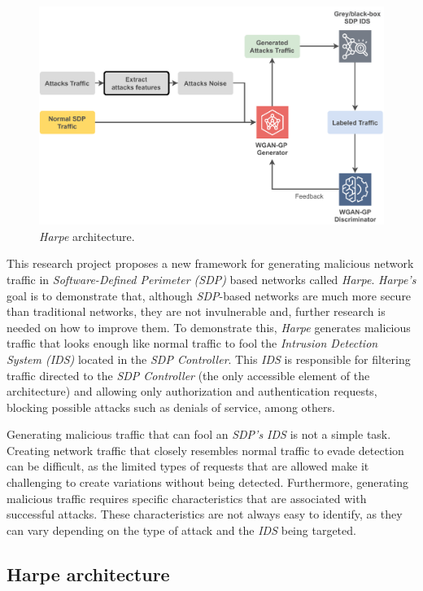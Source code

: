 \begin{figure}
    \centering
    \includegraphics[width=.7\textwidth]{Figures/Harpe-WGAN-GP}
    \caption{\label{fig:harpe-architecture} \textit{Harpe} architecture.}
\end{figure}

This research project proposes a new framework for generating malicious network traffic in
\textit{Software-Defined Perimeter (SDP)} based networks called \textit{Harpe}.
\textit{Harpe's} goal is to demonstrate that, although \textit{SDP}-based networks are much more secure than traditional
networks, they are not invulnerable and, further research is needed on how to improve them.
To demonstrate this, \textit{Harpe} generates malicious traffic that looks enough like normal traffic to fool the
\textit{Intrusion Detection System (IDS)} located in the \textit{SDP Controller}.
This \textit{IDS} is responsible for filtering traffic directed to the \textit{SDP Controller} (the only accessible
element of the architecture) and allowing only authorization and authentication requests, blocking possible attacks
such as denials of service, among others.

Generating malicious traffic that can fool an \textit{SDP's IDS} is not a simple task.
Creating network traffic that closely resembles normal traffic to evade detection can be difficult, as the limited
types of requests that are allowed make it challenging to create variations without being detected.
Furthermore, generating malicious traffic requires specific characteristics that are associated with successful
attacks.
These characteristics are not always easy to identify, as they can vary depending on the type of attack and the
\textit{IDS} being targeted.

\subsection{Harpe architecture}\label{subsec:traffic-generation}

